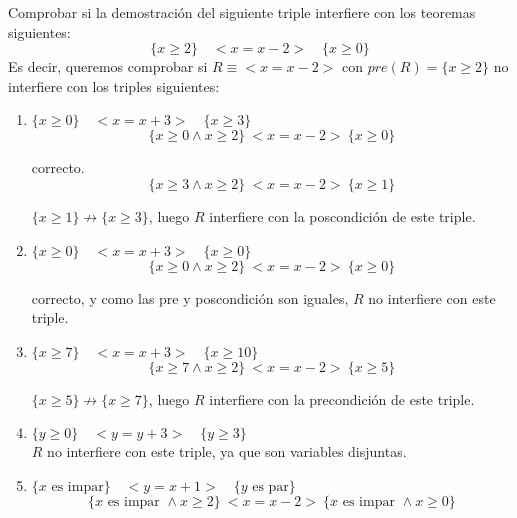 \begin{ejercicio}
    Comprobar si la demostración del siguiente triple interfiere con los teoremas siguientes:
    \[
        \{x \geq 2\} \quad < x = x - 2 > \quad \{x \geq 0\}
    \]
    Es decir, queremos comprobar si $R\equiv <x = x-2>$ con $pre(R) = \{x\geq 2\}$ no interfiere con los triples siguientes:
    \begin{enumerate}
        \item $\{x \geq 0\} \quad < x = x + 3 > \quad \{x \geq 3\}$\\
            \begin{equation*}
                \{x\geq 0 \land x \geq 2\}\ <x=x-2>\ \{x\geq 0\}
            \end{equation*}

            correcto.
            \begin{equation*}
                \{x\geq 3 \land x \geq 2\}\ <x=x-2>\ \{x\geq 1\}
            \end{equation*}

            $\{x\geq 1\}\not\rightarrow\{x\geq 3\}$, luego $R$ interfiere con la poscondición de este triple.
        \item $\{x \geq 0\} \quad < x = x + 3 > \quad \{x \geq 0\}$\\
            \begin{equation*}
                \{x\geq 0 \land x \geq 2\}\ <x=x-2>\ \{x\geq 0\}
            \end{equation*}

            correcto, y como las pre y poscondición son iguales, $R$ no interfiere con este triple.
        \item $\{x \geq 7\} \quad < x = x + 3 > \quad \{x \geq 10\}$\\
            \begin{equation*}
                \{x\geq 7 \land x \geq 2\}\ <x=x-2>\ \{x\geq 5\}
            \end{equation*}

            $\{x\geq 5\}\not\rightarrow\{x\geq 7\}$, luego $R$ interfiere con la precondición de este triple.
        \item $\{y \geq 0\} \quad < y = y + 3 > \quad \{y \geq 3\}$\\
            $R$ no interfiere con este triple, ya que son variables disjuntas.
        \item $\{x \text{ es impar}\} \quad < y = x + 1 > \quad \{y \text{ es par}\}$\\
            \begin{equation*}
                \{x \text{ es impar } \land x\geq 2\}\ <x=x-2>\ \{x \text{ es impar } \land x \geq 0\}
            \end{equation*}


\end{enumerate}
\end{ejercicio}
